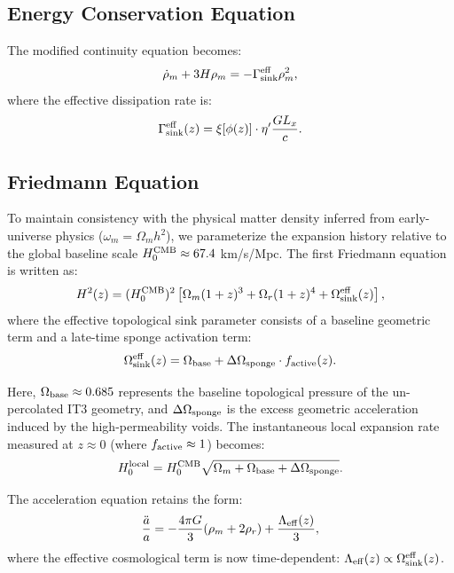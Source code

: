 \documentclass[12pt,a4paper]{article}
\begin{document}
\subsection{Energy Conservation Equation}

The modified continuity equation becomes:
\begin{equation}
\dot{\rho}_m + 3H\rho_m = -\Gamma_{\rm sink}^{\rm eff} \rho_m^2,
\end{equation}
where the effective dissipation rate is:
\begin{equation}
\Gamma_{\rm sink}^{\rm eff}(z) = \xi[\phi(z)] \cdot \eta' \frac{G L_x}{c}.
\end{equation}

\subsection{Friedmann Equation}

To maintain consistency with the physical matter density inferred from early-universe physics ($\omega_m = \Omega_m h^2$), we parameterize the expansion history relative to the global baseline scale $H_0^{\rm CMB} \approx 67.4$ km/s/Mpc. The first Friedmann equation is written as:
\begin{equation}
H^2(z) = (H_0^{\rm CMB})^2 \left[ \Omega_m (1+z)^3 + \Omega_r (1+z)^4 + \Omega_{\rm sink}^{\rm eff}(z) \right],
\label{eq:friedmann}
\end{equation}
where the effective topological sink parameter consists of a baseline geometric term and a late-time sponge activation term:
\begin{equation}
\Omega_{\rm sink}^{\rm eff}(z) = \Omega_{\rm base} + \Delta\Omega_{\rm sponge} \cdot f_{\rm active}(z).
\end{equation}

Here, $\Omega_{\rm base} \approx 0.685$ represents the baseline topological pressure of the un-percolated IT3 geometry, and $\Delta\Omega_{\rm sponge}$ is the excess geometric acceleration induced by the high-permeability voids. The instantaneous local expansion rate measured at $z \approx 0$ (where $f_{\rm active} \approx 1$) becomes:
\begin{equation}
H_0^{\rm local} = H_0^{\rm CMB} \sqrt{ \Omega_m + \Omega_{\rm base} + \Delta\Omega_{\rm sponge} }.
\end{equation}

The acceleration equation retains the form:
\begin{equation} 
\frac{\ddot{a}}{a} = -\frac{4\pi G}{3} (\rho_m + 2\rho_r) + \frac{\Lambda_{\rm eff}(z)}{3},
\end{equation}
where the effective cosmological term is now time-dependent: $\Lambda_{\rm eff}(z) \propto \Omega_{\rm sink}^{\rm eff}(z)$.
\end{document}
